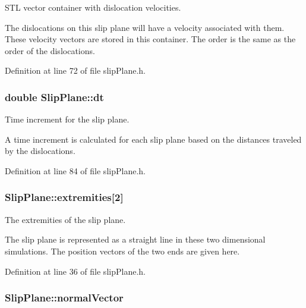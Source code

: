 S\-T\-L vector container with dislocation velocities. 

The dislocations on this slip plane will have a velocity associated with them. These velocity vectors are stored in this container. The order is the same as the order of the dislocations. 

Definition at line 72 of file slip\-Plane.\-h.

\hypertarget{classSlipPlane_ad786135547799363ad2931e43522c2be}{
\subsubsection[{dt}]{\setlength{\rightskip}{0pt plus 5cm}double Slip\-Plane\-::dt\hspace{0.3cm}{\ttfamily [protected]}}}\label{db/d25/classSlipPlane_ad786135547799363ad2931e43522c2be}


Time increment for the slip plane. 

A time increment is calculated for each slip plane based on the distances traveled by the dislocations. 

Definition at line 84 of file slip\-Plane.\-h.

\hypertarget{classSlipPlane_a52df6a08ab40ffd0dfb4a467e45d2835}{
\subsubsection[{extremities}]{ Slip\-Plane\-::extremities\mbox{[}2\mbox{]}\hspace{0.3cm}{\ttfamily [protected]}}}\label{db/d25/classSlipPlane_a52df6a08ab40ffd0dfb4a467e45d2835}


The extremities of the slip plane. 

The slip plane is represented as a straight line in these two dimensional simulations. The position vectors of the two ends are given here. 

Definition at line 36 of file slip\-Plane.\-h.

\hypertarget{classSlipPlane_aad33ce7b595e5fc55aefe51c7b0957f2}{
\subsubsection[{normal\-Vector}]{ Slip\-Plane\-::normal\-Vector\hspace{0.3cm}{\ttfamily [protected]}}}\label{db/d25/classSlipPlane_aad33ce7b595e5fc55aefe51c7b0957f2}


